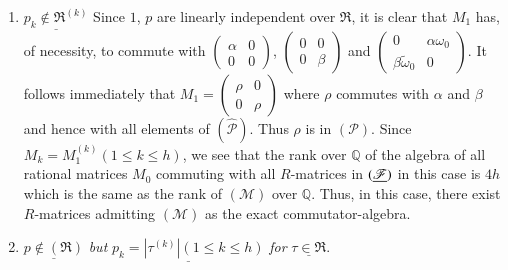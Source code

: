 \begin{enumerate}
\renewcommand{\theenumi}{\roman{enumi}}
\renewcommand{\labelenumi}{(\theenumi)}
\item $\underline{p_{k}\not\in \mathfrak{R}^{(k)}}$ Since $1$, $p$ are linearly independent over
  $\mathfrak{R}$, it is clear that $M_{1}$ has, of necessity, to
  commute with $\left(\begin{smallmatrix} \alpha & 0\\ 0 & 0
  \end{smallmatrix}\right)$, $\left(\begin{smallmatrix}  0 & 0\\ 0 &
    \beta
  \end{smallmatrix}\right)$ and $\left(\begin{smallmatrix} 0 &
    \alpha\omega_{0}\\ \beta\widetilde{\omega}_{0} & 0
  \end{smallmatrix}\right)$. It follows immediately that
  $M_{1}=\left(\begin{smallmatrix} \rho & 0\\ 0 & \rho
  \end{smallmatrix}\right)$ where $\rho$ commutes with $\alpha$ and
  $\beta$ and hence with all elements of
  $(\widehat{\mathscr{P}})$. Thus $\rho$ is in $(\mathscr{P})$. Since
  $M_{k}=M_{1}^{(k)}(1\leq k\leq h)$, we see that the rank over
  $\mathbb{Q}$ of the algebra of all rational matrices $M_{0}$
  commuting with all $R$-matrices in $(\underline{\mathscr{F}})$ in this case
  is $4h$ which is the same as the rank of $(\mathscr{M})$ over
  $\mathbb{Q}$. Thus, in this case, there exist $R$-matrices admitting
  $(\mathscr{M})$ as the exact commutator-algebra.

\item $\underline{p\not\in (\mathfrak{R})}$ {\em but}
  $\underline{p_{k}=|\tau^{(k)}|(1\leq k\leq h)}$ {\em for}
  $\underline{\tau\in \mathfrak{R}}$.


\end{enumerate}
